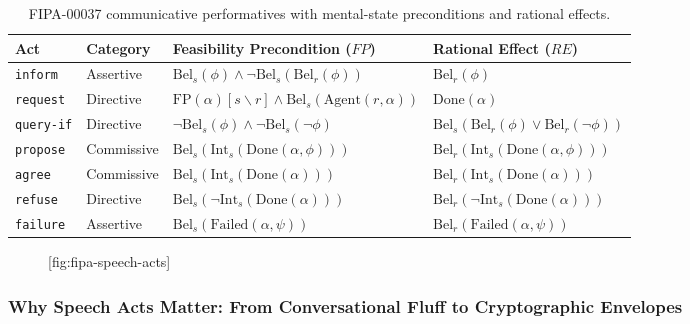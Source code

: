 \documentclass[11pt,a4paper]{article}
\begin{document}
\begin{table}[H]
\centering
\footnotesize
\setlength{\tabcolsep}{3pt}
\begin{tabularx}{\textwidth}{l l >{\raggedright\arraybackslash}X >{\raggedright\arraybackslash}X}
\toprule
\textbf{Act} & \textbf{Category} & \textbf{Feasibility Precondition ($FP$)} & \textbf{Rational Effect ($RE$)} \\
\midrule
\texttt{inform} & Assertive & $\mathrm{Bel}_s(\phi) \land \neg\mathrm{Bel}_s(\mathrm{Bel}_r(\phi))$ & $\mathrm{Bel}_r(\phi)$ \\
\texttt{request} & Directive & $\mathrm{FP}(\alpha)[s\backslash r] \land \mathrm{Bel}_s(\mathrm{Agent}(r, \alpha))$ & $\mathrm{Done}(\alpha)$ \\
\texttt{query-if} & Directive & $\neg\mathrm{Bel}_s(\phi) \land \neg\mathrm{Bel}_s(\neg\phi)$ & $\mathrm{Bel}_s(\mathrm{Bel}_r(\phi) \lor \mathrm{Bel}_r(\neg\phi))$ \\
\texttt{propose} & Commissive & $\mathrm{Bel}_s(\mathrm{Int}_s(\mathrm{Done}(\alpha, \phi)))$ & $\mathrm{Bel}_r(\mathrm{Int}_s(\mathrm{Done}(\alpha, \phi)))$ \\
\texttt{agree} & Commissive & $\mathrm{Bel}_s(\mathrm{Int}_s(\mathrm{Done}(\alpha)))$ & $\mathrm{Bel}_r(\mathrm{Int}_s(\mathrm{Done}(\alpha)))$ \\
\texttt{refuse} & Directive & $\mathrm{Bel}_s(\neg\mathrm{Int}_s(\mathrm{Done}(\alpha)))$ & $\mathrm{Bel}_r(\neg\mathrm{Int}_s(\mathrm{Done}(\alpha)))$ \\
\texttt{failure} & Assertive & $\mathrm{Bel}_s(\mathrm{Failed}(\alpha, \psi))$ & $\mathrm{Bel}_r(\mathrm{Failed}(\alpha, \psi))$ \\
\bottomrule
\end{tabularx}
\caption{FIPA-00037 communicative performatives with mental-state preconditions and rational effects.}
\label{tab:fipa-performatives}
\end{table}

\begin{figure}[tp]
  \centering
  [fig:fipa-speech-acts]
\end{figure}

\subsubsection{Why Speech Acts Matter: From Conversational Fluff to Cryptographic Envelopes}
\label{sec:why-fipa-matters}
\end{document}
